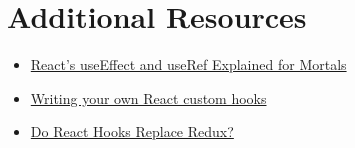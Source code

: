 \section{Additional Resources}

\begin{itemize}[leftmargin=*]
    \item \href{https://leewarrick.com/blog/react-use-effect-explained/}{React's useEffect and useRef Explained for Mortals}
    \item \href{https://tvernon.tech/blog/react-custom-hook-for-forms}{Writing your own React custom hooks}
    \item \href{https://medium.com/javascript-scene/do-react-hooks-replace-redux-210bab340672}{Do React Hooks Replace Redux?}
\end{itemize}
